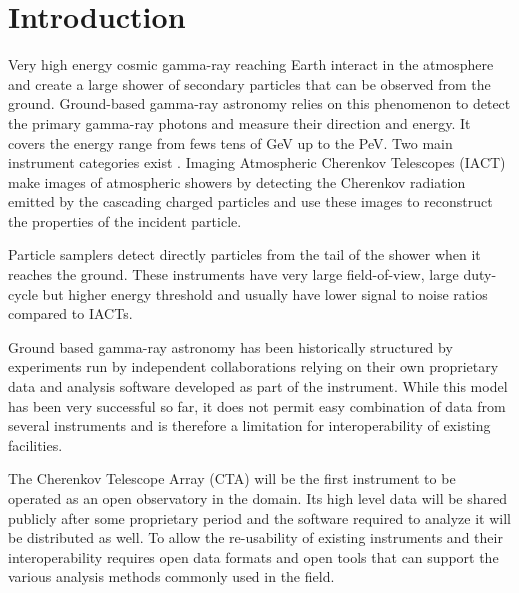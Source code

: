 \section{Introduction}
\label{sec:introduction}


Very high energy cosmic gamma-ray reaching Earth interact in the atmosphere and
create a large shower of secondary particles that can be observed from the ground.
Ground-based gamma-ray astronomy relies on this phenomenon to detect the
primary gamma-ray photons and measure their direction and energy.
It covers the energy range from fews tens of GeV up to the PeV.
Two main instrument categories exist \citep{2015CRPhy..16..610D}.
Imaging Atmospheric Cherenkov Telescopes (IACT) make images of atmospheric showers
by detecting the Cherenkov radiation emitted by the cascading charged particles and
use these images to reconstruct the properties of the incident particle.

Particle samplers detect directly particles from the tail of the shower when it reaches
the ground. These instruments have very large field-of-view, large duty-cycle but higher
energy threshold and usually have lower signal to noise ratios compared to IACTs.

Ground based gamma-ray astronomy has been historically structured
by experiments run by independent collaborations relying
on their own proprietary data and analysis software developed as part of the
instrument. While this model has been very successful so far, it does not
permit easy combination of data from several instruments and is therefore
a limitation for interoperability of existing facilities.

The Cherenkov Telescope Array (CTA) will be the first instrument to be operated
as an open observatory in the domain. Its high level data will be shared publicly after
some proprietary period and the software required to analyze it will be distributed
as well. To allow the re-usability of existing instruments and their interoperability
requires open data formats and open tools that can support the various analysis methods
commonly used in the field.

